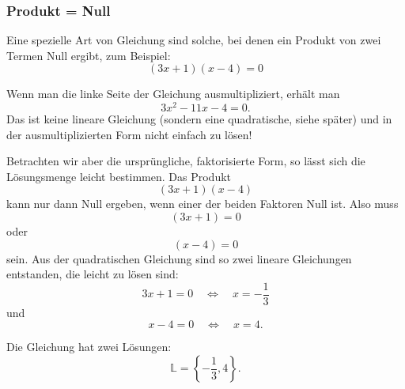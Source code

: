 \subsubsection*{Produkt = Null}

Eine spezielle Art von Gleichung sind solche, bei denen ein Produkt von zwei Termen Null ergibt, zum Beispiel:
\[
    (3x+1)(x-4)=0
\]

Wenn man die linke Seite der Gleichung ausmultipliziert, erhält man
\[
    3x^2-11x-4=0.
\]
Das ist keine lineare Gleichung (sondern eine quadratische, siehe später) und in der ausmultiplizierten Form nicht einfach zu lösen!

Betrachten wir aber die ursprüngliche, faktorisierte Form, so lässt sich die Lösungsmenge leicht bestimmen. Das Produkt
\[
    (3x+1)(x-4)
\]
kann nur dann Null ergeben, wenn einer der beiden Faktoren Null ist. Also muss
\[
    (3x+1)=0
\]
oder
\[
    (x-4)=0
\]
sein. Aus der quadratischen Gleichung sind so zwei lineare Gleichungen entstanden, die leicht zu lösen sind:
\[
    3x+1=0
    \quad\Longleftrightarrow\quad
    x=-\frac13
\]
und
\[
    x-4=0
    \quad\Longleftrightarrow\quad
    x=4.
\]

Die Gleichung hat zwei Lösungen:
\[
    \mathbb{L}=\left\{-\frac13,4\right\}.
\]

